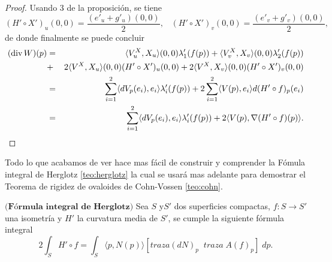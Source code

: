\begin{proof}
	Usando 3 de la proposición, se tiene
	${ }$\\
	\[
		(H' \circ X')_u (0,0) = \frac{(e'_{u} + g'_{u})(0,0)}{2}, \;\;\; (H' \circ X')_v (0,0) = \frac{(e'_{v} + g'_{v})(0,0)}{2},
	\]
	${ }$\\
	de donde finalmente se puede concluir
	${ }$\\
	\begin{eqnarray*}
		(\hbox{div}\,W)(p)&=& \langle V^X_u,X_u\rangle(0,0) \lambda'_1(f(p))+\langle V^X_v,X_v\rangle(0,0) \lambda'_2(f(p))\\ &+& 2\langle V^X,X_u\rangle(0,0)(H'\circ X')_u(0,0)+2\langle V^X,X_v\rangle(0,0)(H'\circ X')_v(0,0)\\
		&=&\sum_{i=1}^2\langle dV_p(e_i),e_i\rangle\lambda'_i(f(p))+2\sum_{i=1}^2\langle V(p),e_i\rangle d(H'\circ f)_p(e_i)\\
		&=&\sum_{i=1}^2\langle dV_p(e_i),e_i\rangle\lambda'_i(f(p))+2\langle V(p),\nabla(H'\circ f)(p)\rangle.
	\end{eqnarray*}
\end{proof}
${ }$\\

Todo lo que acabamos de ver hace mas fácil de construir y comprender la Fómula integral de Herglotz \ref{teo:herglotz} la cual se usará mas adelante para demostrar el Teorema de rigidez de ovaloides de Cohn-Vossen \ref{teo:cohn}.
${ }$\\

\begin{teorema}\label{teo:herglotz}
	$\textbf{(Fórmula integral de Herglotz)}$ Sea $S$ y$S'$ dos superficies compactas, $f: S \to S'$ una isometría y $H'$ la curvatura media de $S'$, se cumple la siguiente fórmula integral
	${ }$\\
	\[
		2 \int_S H' \circ f = \int_S \langle p, N(p) \rangle [traza(dN)_p \;\; traza \; A(f)_p] \; dp.
	\]
	
\end{teorema}


